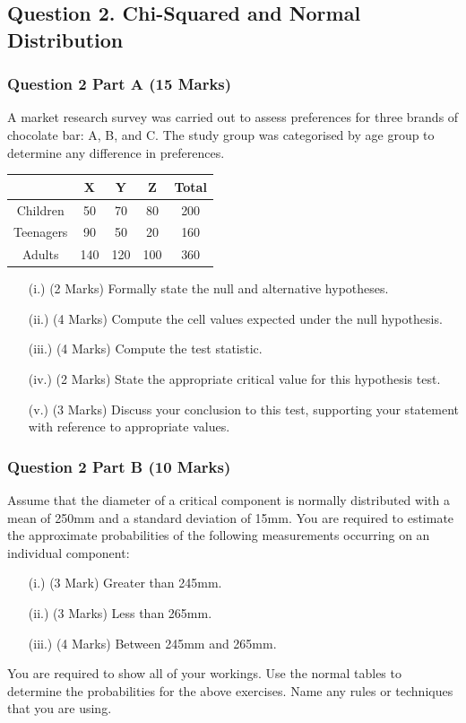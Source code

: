 \documentclass[a4paper,12pt]{article}
\begin{document}
\bigskip

\subsection*{Question 2. Chi-Squared and Normal Distribution}
\subsubsection*{Question 2 Part A (15 Marks)}

A market research survey was carried out to assess preferences for three brands of chocolate bar: A, B, and C. 
The study group was categorised by age group to determine any difference in preferences.


{
	\large
	\begin{center}
		\begin{tabular}{|c|c|c|c|c|}
			\hline
			& X & Y & Z &  Total\\ \hline
			Children  & 50 & 70 & 80 & 200 \\ \hline
			Teenagers  & 90 & 50 & 20 &  160\\ \hline
			Adults  & 140 & 120 & 100 & 360\\ \hline
		\end{tabular} 
	\end{center}
}
\begin{itemize}
	\item[(i.)](2 Marks) Formally state the null and alternative hypotheses.
	\item[(ii.)] (4 Marks) Compute the cell values expected under the null hypothesis. 
	\item[(iii.)](4 Marks) Compute the test statistic.
	\item[(iv.)](2 Marks) State the appropriate critical value for this hypothesis test.
	\item[(v.)](3 Marks) Discuss your conclusion to this test, supporting your statement with reference to appropriate values.
\end{itemize}

\subsubsection*{Question 2 Part B (10 Marks)}
Assume that the diameter of a critical component is normally distributed with a mean of 250mm and a standard deviation of 15mm. You are required to estimate the approximate probabilities of the following measurements occurring on an individual component:
\begin{itemize}
	\item[(i.)](3 Mark) Greater than 245mm.
	\item[(ii.)](3 Marks) Less than 265mm.
	\item [(iii.)](4 Marks) Between 245mm and 265mm.
\end{itemize}
\bigskip
\noindent  You are required to show all of your workings. Use the normal tables to determine the probabilities for the above exercises. Name any rules or techniques that you are using. 
\end{document}
